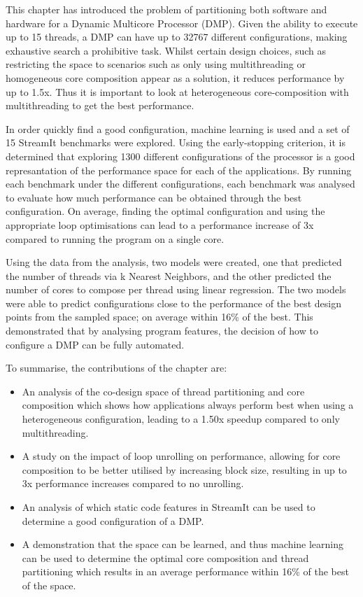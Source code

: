 This chapter has introduced the problem of partitioning both software and hardware for a Dynamic Multicore Processor (DMP).
Given the ability to execute up to 15 threads, a DMP can have up to 32767 different configurations, making exhaustive search a prohibitive task.
Whilst certain design choices, such as restricting the space to scenarios such as only using multithreading or homogeneous core composition appear as a solution, it reduces performance by up to 1.5x.
Thus it is important to look at heterogeneous core-composition with multithreading to get the best performance.

In order quickly find a good configuration, machine learning is used and a set of 15 StreamIt benchmarks were explored.
Using the early-stopping criterion, it is determined that exploring 1300 different configurations of the processor is a good represantation of the performance space for each of the applications.
By running each benchmark under the different configurations, each benchmark was analysed to evaluate how much performance can be obtained through the best configuration.
On average, finding the optimal configuration and using the appropriate loop optimisations can lead to a performance increase of 3x compared to running the program on a single core.

Using the data from the analysis, two models were created, one that predicted the number of threads via k Nearest Neighbors, and the other predicted the number of cores to compose per thread using linear regression.
The two models were able to predict configurations close to the performance of the best design points from the sampled space; on average within 16\% of the best.
This demonstrated that by analysing program features, the decision of how to configure a DMP can be fully automated.

To summarise, the contributions of the chapter are:
\begin{itemize}
\item An analysis of the co-design space of thread partitioning and core composition which shows how applications always perform best when using a heterogeneous configuration, leading to a 1.50x speedup compared to only multithreading.
\vspace{-0.5em}
\item A study on the impact of loop unrolling on performance, allowing for core composition to be better utilised by increasing block size, resulting in up to 3x performance increases compared to no unrolling.
\vspace{-0.5em}
\item An analysis of which static code features in StreamIt can be used to determine a good configuration of a DMP.
\vspace{-0.5em}
\item A demonstration that the space can be learned, and thus machine learning can be used to determine the optimal core composition and thread partitioning which results in an average performance within 16\% of the best of the space.
\end{itemize}
